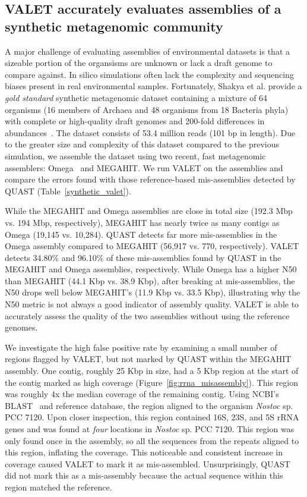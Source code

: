 \documentclass{bioinfo}
\begin{document}
\subsection{VALET accurately evaluates assemblies of a synthetic metagenomic community}

A major challenge of evaluating assemblies of environmental datasets is that a sizeable portion of the organsisms are unknown or lack a draft genome to compare against.
In silico simulations often lack the complexity and sequencing biases present in real environmental samples.
Fortunately, Shakya et al. provide a \emph{gold standard} synthetic metagenomic dataset containing a mixture of 64 organisms (16 members of Archaea and 48 organisms from 18 Bacteria phyla) with complete or high-quality draft genomes and 200-fold differences in abundances~\citep{shakya2013comparative}.
The dataset consists of 53.4 million reads (101 bp in length).
Due to the greater size and complexity of this dataset compared to the previous simulation, we assemble the dataset using two recent, fast metagenomic assemblers: Omega~\citep{haider2014omega} and MEGAHIT\citep{li2015megahit}.
We run VALET on the assemblies and compare the errors found with those reference-based mis-assemblies detected by QUAST (Table~\ref{synthetic_valet}).


While the MEGAHIT and Omega assemblies are close in total size (192.3 Mbp vs. 194 Mbp, respectively), MEGAHIT has nearly twice as many contigs as Omega (19,145 vs. 10,284).
QUAST detects far more mis-assemblies in the Omega assembly compared to MEGAHIT (56,917 vs. 770, respectively).
VALET detects 34.80\% and 96.10\% of these mis-assemblies found by QUAST in the MEGAHIT and Omega assemblies, respectively.
While Omega has a higher N50 than MEGAHIT (44.1 Kbp vs. 38.9 Kbp), after breaking at mis-assemblies, the N50 drops well below MEGAHIT's (11.9 Kbp vs. 33.5 Kbp), illustrating why the N50 metric is not always a good indicator of assembly quality.
VALET is able to accurately assess the quality of the two assemblies without using the reference genomes.

We investigate the high false positive rate by examining a small number of regions flagged by VALET, but not marked by QUAST within the MEGAHIT assembly.
One contig, roughly 25 Kbp in size, had a 5 Kbp region at the start of the contig marked as high coverage (Figure~\ref{fig:rrna_misassembly}).
This region was roughly 4x the median coverage of the remaining contig.
Using NCBI's BLAST~\citep{blast} and reference database, the region aligned to the organism \emph{Nostoc} sp. PCC 7120.
Upon closer inspection, this region contained 16S, 23S, and 5S rRNA genes and was found at \emph{four} locations in  \emph{Nostoc} sp. PCC 7120.
This region was only found once in the assembly, so all the sequences from the repeats aligned to this region, inflating the coverage.
This noticeable and consistent increase in coverage caused VALET to mark it as mis-assembled.
Unsurprisingly, QUAST did not mark this as a mis-assembly because the actual sequence within this region matched the reference.
\end{document}

